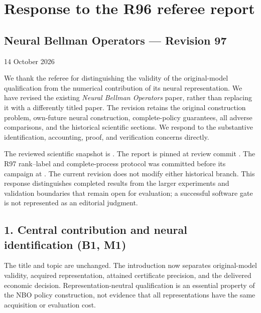 \hypertarget{response-to-the-r96-referee-report}{%
\section{Response to the R96 referee
report}\label{response-to-the-r96-referee-report}}

\hypertarget{neural-bellman-operators-revision-97}{%
\subsection{Neural Bellman Operators --- Revision
97}\label{neural-bellman-operators-revision-97}}

14 October 2026

We thank the referee for distinguishing the validity of the
original-model qualification from the numerical contribution of its
neural representation. We have revised the existing \emph{Neural Bellman
Operators} paper, rather than replacing it with a differently titled
paper. The revision retains the original construction problem,
own-future neural construction, complete-policy guarantees, all adverse
comparisons, and the historical scientific sections. We respond to the
substantive identification, accounting, proof, and verification concerns
directly.

The reviewed scientific snapshot is
. The report is pinned at
review commit . The R97
rank--label and complete-process protocol was committed before its
campaign at . The current
revision does not modify either historical branch. This response
distinguishes completed results from the larger experiments and
validation boundaries that remain open for evaluation; a successful
software gate is not represented as an editorial judgment.

\hypertarget{central-contribution-and-neural-identification-b1-m1}{%
\subsection{1. Central contribution and neural identification (B1,
M1)}\label{central-contribution-and-neural-identification-b1-m1}}

The title and topic are unchanged. The introduction now separates
original-model validity, acquired representation, attained certificate
precision, and the delivered economic decision. Representation-neutral
qualification is an essential property of the NBO policy construction,
not evidence that all representations have the same acquisition or
evaluation cost.

